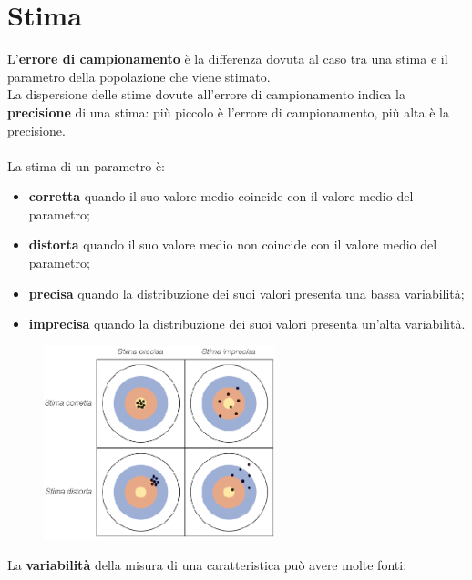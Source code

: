 \documentclass[10pt, draft]{book}
\begin{document}
\section{Stima}
L'\textbf{errore di campionamento} è la differenza dovuta al caso tra una stima e il parametro della popolazione che viene stimato.
\\
La dispersione delle stime dovute all'errore di campionamento indica la \textbf{precisione} di una stima: più piccolo è l'errore di campionamento, più alta è la precisione.
\\
\\
La stima di un parametro è:
\begin{itemize}
    \item \textbf{corretta} quando il suo valore medio coincide con il valore medio del parametro;
    \item \textbf{distorta} quando il suo valore medio non coincide con il valore medio del parametro;
    \item \textbf{precisa} quando la distribuzione dei suoi valori presenta una bassa variabilità;
    \item \textbf{imprecisa} quando la distribuzione dei suoi valori presenta un’alta variabilità.
\end{itemize}
    \begin{figure}[H]\label{fig1.2-2}
    \centering
    \includegraphics[width=0.6\textwidth]{fig1.2-2}
    \caption{\small{}}
    \end{figure}
La \textbf{variabilità} della misura di una caratteristica può avere molte fonti:
\end{document}
